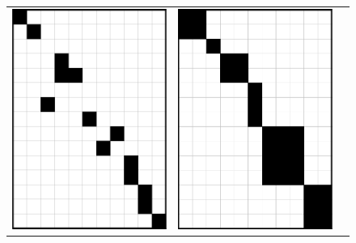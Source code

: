 \documentclass[twocolumn]{article}
\begin{document}
\begin{figure}[tbp]
  \setlength{\tabcolsep}{12pt}
  \begin{tabular}{c c c}
      \includegraphics[scale=0.4]{imgs/grow-diag-final-and-align.png}
    & \includegraphics[scale=0.4]{imgs/phrase-align.png}

\end{tabular}
\end{figure}
\end{document}
